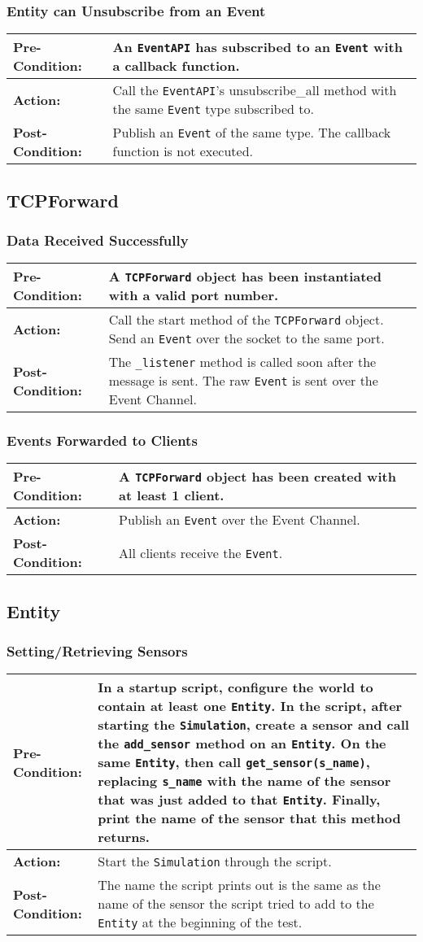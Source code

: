 \documentclass[titlepage]{article}
\newcommand{\testcase}[3]{
    \begin{center}
    \begin{tabular}{| l | p{0.7\textwidth}|}
        \hline
        \rowcolor[gray]{0.8}\textbf{Pre-Condition:} & #1 \\ \hline
        \textbf{Action:} & #2 \\ \hline
        \rowcolor[gray]{0.8}\textbf{Post-Condition:} & #3 \\ \hline
    \end{tabular}
    \end{center}
}
\begin{document}
\subsubsection{Entity can Unsubscribe from an Event}
\testcase{An \texttt{EventAPI} has subscribed to an \texttt{Event} with a callback function.}{Call the \texttt{EventAPI}'s unsubscribe\_all method with the same \texttt{Event} type subscribed to.}{Publish an \texttt{Event} of the same type. The callback function is not executed.}

\subsection{TCPForward}
\subsubsection{Data Received Successfully}
\testcase{A \texttt{TCPForward} object has been instantiated with a valid port number.}{Call the start method of the \texttt{TCPForward} object. Send an \texttt{Event} over the socket to the same port. }{The \texttt{\_listener} method is called soon after the message is sent. The raw \texttt{Event} is sent over the Event Channel. }

\subsubsection{Events Forwarded to Clients}
\testcase{A \texttt{TCPForward} object has been created with at least 1 client.}{Publish an \texttt{Event} over the Event Channel.}{All clients receive the \texttt{Event}.}

\subsection{Entity}
\subsubsection{Setting/Retrieving Sensors}
\testcase{In a startup script, configure the world to contain at least one \texttt{Entity}. In the script, after starting the \texttt{Simulation}, create a sensor and call the \texttt{add\_sensor} method on an \texttt{Entity}.  On the same \texttt{Entity}, then call \texttt{get\_sensor(s\_name)}, replacing \texttt{s\_name} with the name of the sensor that was just added to that \texttt{Entity}.  Finally, print the name of the sensor that this method returns.}{Start the \texttt{Simulation} through the script.}{The name the script prints out is the same as the name of the sensor the script tried to add to the \texttt{Entity} at the beginning of the test.}
\end{document}
